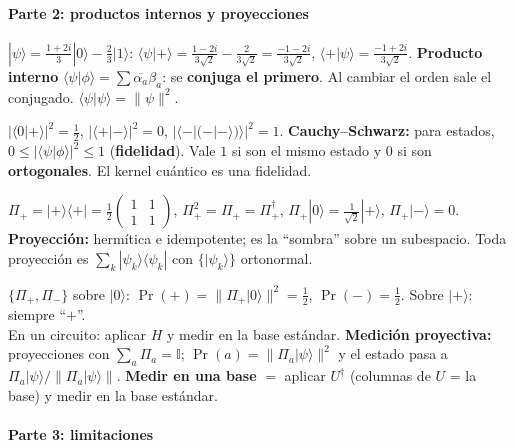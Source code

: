 \documentclass[11pt, a4paper, twoside, openright]{report}
\begin{document}
\paragraph{Parte 2: productos internos y proyecciones}\mbox{}

{$|\psi\rangle = \tfrac{1+2i}{3}|0\rangle - \tfrac23|1\rangle$: \quad $\langle\psi|+\rangle = \tfrac{1-2i}{3\sqrt2} - \tfrac{2}{3\sqrt2} = \tfrac{-1-2i}{3\sqrt2}$, \quad $\langle+|\psi\rangle = \tfrac{-1+2i}{3\sqrt2}$.}
{\textbf{Producto interno} $\langle\psi|\phi\rangle = \sum\overline{\alpha_a}\beta_a$: se \textbf{conjuga el primero}. Al cambiar el orden sale el conjugado. $\langle\psi|\psi\rangle = \|\psi\|^2$.}

{$|\langle0|+\rangle|^2 = \tfrac12$, \qquad $|\langle+|-\rangle|^2 = 0$, \qquad $|\langle-|(-|-\rangle)\rangle|^2 = 1$.}
{\textbf{Cauchy--Schwarz:} para estados, $0\le|\langle\psi|\phi\rangle|^2\le1$ (\textbf{fidelidad}). Vale $1$ si son el mismo estado y $0$ si son \textbf{ortogonales}. El kernel cuántico es una fidelidad.}

{$\Pi_+ = |+\rangle\langle+| = \tfrac12\begin{pmatrix}1&1\\1&1\end{pmatrix}$, \quad $\Pi_+^2 = \Pi_+ = \Pi_+^\dagger$, \quad $\Pi_+|0\rangle = \tfrac{1}{\sqrt2}|+\rangle$, \quad $\Pi_+|-\rangle = 0$.}
{\textbf{Proyección:} hermítica e idempotente; es la ``sombra'' sobre un subespacio. Toda proyección es $\sum_k|\psi_k\rangle\langle\psi_k|$ con $\{|\psi_k\rangle\}$ ortonormal.}

{$\{\Pi_+,\Pi_-\}$ sobre $|0\rangle$: \; $\Pr(+) = \|\Pi_+|0\rangle\|^2 = \tfrac12$, \; $\Pr(-) = \tfrac12$. \quad Sobre $|+\rangle$: siempre ``$+$''. \\
En un circuito: \; aplicar $H$ y medir en la base estándar.}
{\textbf{Medición proyectiva:} proyecciones con $\sum_a\Pi_a = \mathbb{I}$; $\Pr(a) = \|\Pi_a|\psi\rangle\|^2$ y el estado pasa a $\Pi_a|\psi\rangle/\|\Pi_a|\psi\rangle\|$. \textbf{Medir en una base} $=$ aplicar $U^\dagger$ (columnas de $U$ = la base) y medir en la base estándar.}

\paragraph{Parte 3: limitaciones}\mbox{}
\end{document}

